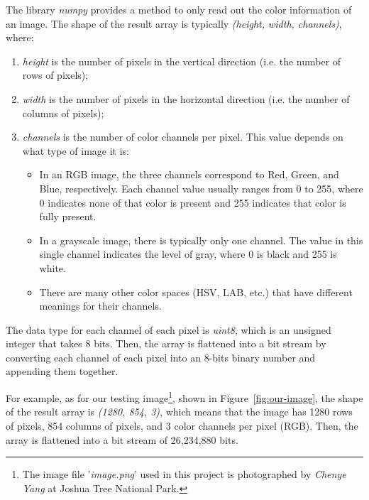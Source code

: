 \documentclass{article}
\begin{document}
The library \textit{numpy} provides a method to only read out the color information of an image. The shape of the result array is typically \textit{(height, width, channels)}, where:
\begin{enumerate}
    \item \textit{height} is the number of pixels in the vertical direction (i.e. the number of rows of pixels);
    \item \textit{width} is the number of pixels in the horizontal direction (i.e. the number of columns of pixels);
    \item \textit{channels} is the number of color channels per pixel. This value depends on what type of image it is: \begin{itemize}
        \item In an RGB image, the three channels correspond to Red, Green, and Blue, respectively. Each channel value usually ranges from 0 to 255, where 0 indicates none of that color is present and 255 indicates that color is fully present.
        \item In a grayscale image, there is typically only one channel. The value in this single channel indicates the level of gray, where 0 is black and 255 is white.
        \item There are many other color spaces (HSV, LAB, etc.) that have different meanings for their channels.
    \end{itemize}
\end{enumerate}
The data type for each channel of each pixel is \textit{uint8}, which is an unsigned integer that takes 8 bits.
Then, the array is flattened into a bit stream by converting each channel of each pixel into an 8-bits binary number and appending them together.

For example, as for our testing image\footnote{The image file '\textit{image.png}' used in this project is photographed by \textit{Chenye Yang} at Joshua Tree National Park.}, shown in Figure~\ref{fig:our-image}, the shape of the result array is \textit{(1280, 854, 3)}, which means that the image has 1280 rows of pixels, 854 columns of pixels, and 3 color channels per pixel (RGB). 
Then, the array is flattened into a bit stream of 26,234,880 bits.
\end{document}
